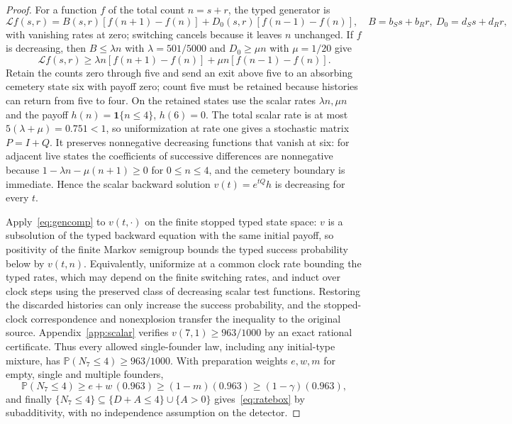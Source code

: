 \documentclass[11pt,a4paper]{article}
\theoremstyle{plain}
\theoremstyle{definition}
\theoremstyle{remark}
\newcommand{\PP}{\mathbb P}
\newcommand{\cL}{\mathcal L}
\newcommand{\ind}{\mathbf 1}
\begin{document}
\begin{proof}
For a function $f$ of the total count $n=s+r$, the typed generator is
\begin{equation}\label{eq:gen}
\cL f(s,r)=B(s,r)[f(n+1)-f(n)]+D_0(s,r)[f(n-1)-f(n)],\quad B=b_Ss+b_Rr,\ D_0=d_Ss+d_Rr,
\end{equation}
with vanishing rates at zero; switching cancels because it leaves $n$ unchanged. If $f$ is decreasing, then $B\le\lambda n$ with $\lambda=501/5000$ and $D_0\ge\mu n$ with $\mu=1/20$ give
\begin{equation}\label{eq:gencomp}
\cL f(s,r)\ge\lambda n[f(n+1)-f(n)]+\mu n[f(n-1)-f(n)] .
\end{equation}
Retain the counts zero through five and send an exit above five to an absorbing cemetery state six with payoff zero; count five must be retained because histories can return from five to four. On the retained states use the scalar rates $\lambda n,\mu n$ and the payoff $h(n)=\ind\{n\le4\}$, $h(6)=0$. The total scalar rate is at most $5(\lambda+\mu)=0.751<1$, so uniformization at rate one gives a stochastic matrix $P=I+Q$. It preserves nonnegative decreasing functions that vanish at six: for adjacent live states the coefficients of successive differences are nonnegative because $1-\lambda n-\mu(n+1)\ge0$ for $0\le n\le4$, and the cemetery boundary is immediate. Hence the scalar backward solution $v(t)=e^{tQ}h$ is decreasing for every $t$.

Apply~\eqref{eq:gencomp} to $v(t,\cdot)$ on the finite stopped typed state space: $v$ is a subsolution of the typed backward equation with the same initial payoff, so positivity of the finite Markov semigroup bounds the typed success probability below by $v(t,n)$. Equivalently, uniformize at a common clock rate bounding the typed rates, which may depend on the finite switching rates, and induct over clock steps using the preserved class of decreasing scalar test functions. Restoring the discarded histories can only increase the success probability, and the stopped-clock correspondence and nonexplosion transfer the inequality to the original source. Appendix~\ref{app:scalar} verifies $v(7,1)\ge963/1000$ by an exact rational certificate. Thus every allowed single-founder law, including any initial-type mixture, has $\PP(N_7\le4)\ge963/1000$. With preparation weights $e,w,m$ for empty, single and multiple founders,
\[
\PP(N_7\le4)\ge e+w\,(0.963)\ge(1-m)(0.963)\ge(1-\gamma)(0.963),
\]
and finally $\{N_7\le4\}\subseteq\{D+A\le4\}\cup\{A>0\}$ gives~\eqref{eq:ratebox} by subadditivity, with no independence assumption on the detector.
\end{proof}
\end{document}
